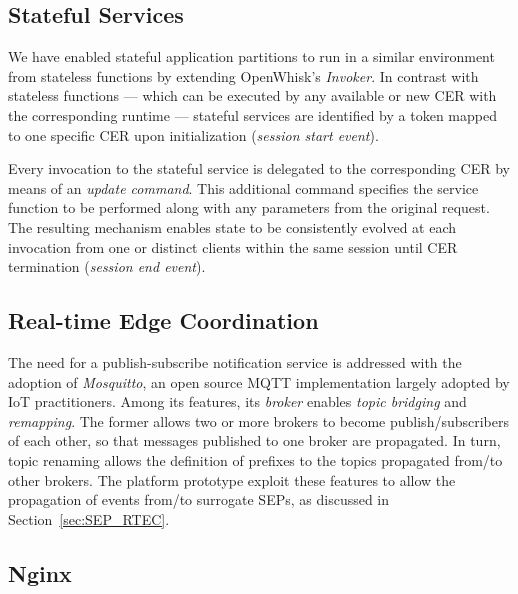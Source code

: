 \subsection{Stateful Services}

We have enabled stateful application partitions to run in a similar environment from stateless functions by extending OpenWhisk's \textit{Invoker}. In contrast with stateless functions --- which can be executed by any available or new CER with the corresponding runtime --- stateful services are identified by a token mapped to one specific CER upon initialization (\textit{session start event}). 

Every invocation to the stateful service is delegated to the corresponding CER by means of an \textit{update command}. This additional command specifies the service function to be performed along with any parameters from the original request. The resulting mechanism enables state to be consistently evolved at each invocation from one or distinct clients within the same session until CER termination (\textit{session end event}).


\subsection{Real-time Edge Coordination}


The need for a publish-subscribe notification service is addressed with the adoption of \textit{Mosquitto}, an open source MQTT implementation largely adopted by IoT practitioners. %
Among its features, its \textit{broker} enables \textit{topic bridging} and \textit{remapping}. The former allows two or more brokers to become publish/subscribers of each other, so that messages published to one broker are propagated. In turn, topic renaming allows the definition of prefixes to the topics propagated from/to other brokers. The platform prototype exploit these features to allow the propagation of events from/to surrogate SEPs, as discussed in Section~\ref{sec:SEP_RTEC}. %

\subsection{Nginx}\label{sec:prototype_Nginx}

